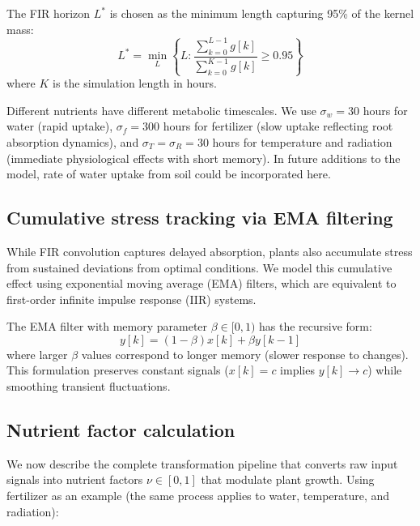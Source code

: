 \documentclass[preprint,12pt]{elsarticle}
\newcommand{\df}[2]{\displaystyle\frac{#1}{#2}}
\begin{document}
The FIR horizon $L^{*}$ is chosen as the minimum length capturing 95\% of the kernel mass:
\begin{equation}
L^{*} = \min_{L} \left\{ L : \df{\sum_{k=0}^{L-1} g[k]}{\sum_{k=0}^{K-1} g[k]} \geq 0.95 \right\}
\label{eqn:L-star}
\end{equation}
where $K$ is the simulation length in hours.

Different nutrients have different metabolic timescales. We use $\sigma_{w} = 30$ hours for water (rapid uptake), $\sigma_{f} = 300$ hours for fertilizer (slow uptake reflecting root absorption dynamics), and $\sigma_{T} = \sigma_{R} = 30$ hours for temperature and radiation (immediate physiological effects with short memory). In future additions to the model, rate of water uptake from soil could be incorporated here.

\subsection{Cumulative stress tracking via EMA filtering}\label{subsec:ema-smooth}

While FIR convolution captures delayed absorption, plants also accumulate stress from sustained deviations from optimal conditions. We model this cumulative effect using exponential moving average (EMA) filters, which are equivalent to first-order infinite impulse response (IIR) systems.

The EMA filter with memory parameter $\beta \in [0,1)$ has the recursive form:
\begin{equation}
y[k] = (1 - \beta)x[k] + \beta y[k-1]
\label{eqn:iir-filter}
\end{equation}
where larger $\beta$ values correspond to longer memory (slower response to changes). This formulation preserves constant signals ($x[k] = c$ implies $y[k] \rightarrow c$) while smoothing transient fluctuations.

\subsection{Nutrient factor calculation}\label{subsec:nutrient-factors}

We now describe the complete transformation pipeline that converts raw input signals into nutrient factors $\nu \in [0,1]$ that modulate plant growth. Using fertilizer as an example (the same process applies to water, temperature, and radiation):
\end{document}
